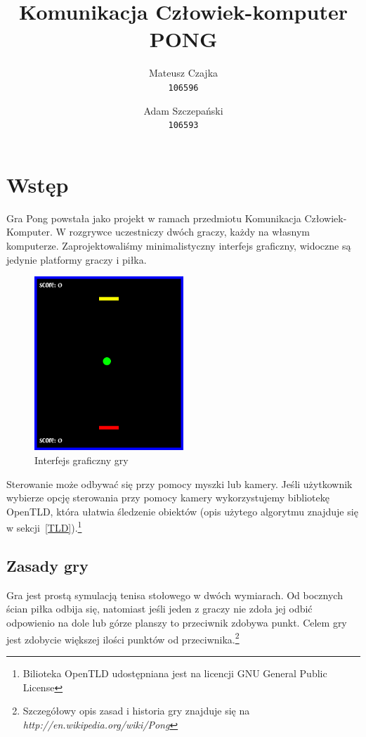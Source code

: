 \documentclass{article}
\author{
	Mateusz Czajka\\
		\texttt{106596}
	\and
		Adam Szczepański\\
		\texttt{106593}
}
\title{Komunikacja Człowiek-komputer\\PONG}
\begin{document}
\maketitle

\section{Wstęp}

Gra Pong powstała jako projekt w ramach przedmiotu Komunikacja Człowiek-Komputer. W rozgrywce uczestniczy dwóch graczy, każdy na własnym komputerze.
Zaprojektowaliśmy minimalistyczny interfejs graficzny, widoczne są jedynie platformy graczy i piłka.

\begin{figure}[!ht]
\centering
\includegraphics[width=0.5\textwidth]{game_screen.png}
\caption{Interfejs graficzny gry}
\label{fig:game}
\end{figure}

Sterowanie może odbywać się przy pomocy myszki lub kamery. Jeśli użytkownik wybierze opcję sterowania przy pomocy kamery wykorzystujemy bibliotekę OpenTLD,
która ułatwia śledzenie obiektów (opis użytego algorytmu znajduje się w sekcji~\ref{TLD}).\footnote{Bilioteka OpenTLD udostępniana jest na licencji GNU General Public License}

\subsection{Zasady gry}

Gra jest prostą symulacją tenisa stołowego w dwóch wymiarach. Od bocznych ścian piłka odbija się, natomiast jeśli jeden z graczy nie zdoła jej odbić odpowienio na dole lub górze
planszy to przeciwnik zdobywa punkt. Celem gry jest zdobycie większej ilości punktów od przeciwnika.\footnote{Szczegółowy opis zasad i historia gry znajduje się na \emph{http://en.wikipedia.org/wiki/Pong}}
\end{document}
